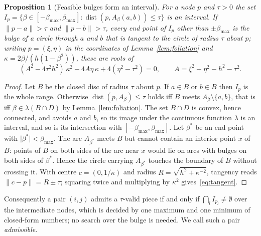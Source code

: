 \documentclass[11pt,a4paper]{article}
\newtheorem{proposition}[theorem]{Proposition}
\theoremstyle{definition}
\theoremstyle{remark}
\newcommand{\dist}{\operatorname{dist}}
\begin{document}
\begin{proposition}[Feasible bulges form an interval]\label{prop:interval}
For a node $p$ and $\tau>0$ the set
$I_p=\{\beta\in[-\beta_{\max},\beta_{\max}]:\dist(p,A_\beta(a,b))\le\tau\}$ is
an interval. If $\lVert p-a\rVert>\tau$ and $\lVert p-b\rVert>\tau$, every end
point of $I_p$ other than $\pm\beta_{\max}$ is the bulge of a circle through
$a$ and $b$ that is tangent to the circle of radius $\tau$ about $p$; writing
$p=(\xi,\eta)$ in the coordinates of Lemma~\ref{lem:foliation} and
$\kappa=2\beta/(h(1-\beta^{2}))$, these are roots of
\begin{equation}\label{eq:tangent}
  (A^{2}-4\tau^{2}h^{2})\,\kappa^{2}-4A\eta\,\kappa+4(\eta^{2}-\tau^{2})=0,
  \qquad A=\xi^{2}+\eta^{2}-h^{2}-\tau^{2}.
\end{equation}
\end{proposition}
\begin{proof}
Let $B$ be the closed disc of radius $\tau$ about $p$. If $a\in B$ or $b\in B$
then $I_p$ is the whole range. Otherwise $\dist(p,A_\beta)\le\tau$ holds iff
$B$ meets $A_\beta\setminus\{a,b\}$, that is iff $\beta\in\lambda(B\cap D)$ by
Lemma~\ref{lem:foliation}. The set $B\cap D$ is convex, hence connected, and
avoids $a$ and $b$, so its image under the continuous function $\lambda$ is an
interval, and so is its intersection with $[-\beta_{\max},\beta_{\max}]$. Let
$\beta^\ast$ be an end point with $\lvert\beta^\ast\rvert<\beta_{\max}$. The
arc $A_{\beta^\ast}$ meets $B$ but cannot contain an interior point $x$ of
$B$: points of $B$ on both sides of the arc near $x$ would lie on arcs with
bulges on both sides of $\beta^\ast$. Hence the circle carrying
$A_{\beta^\ast}$ touches the boundary of $B$ without crossing it. With centre
$c=(0,1/\kappa)$ and radius $R=\sqrt{h^{2}+\kappa^{-2}}$, tangency reads
$\lVert c-p\rVert=R\pm\tau$; squaring twice and multiplying by $\kappa^{2}$
gives~\eqref{eq:tangent}.
\end{proof}

Consequently a pair $(i,j)$ admits a $\tau$-valid piece if and only if
$\bigcap_l I_{p_l}\ne\emptyset$ over the intermediate nodes, which is decided
by one maximum and one minimum of closed-form numbers; no search over the
bulge is needed. We call such a pair \emph{admissible}.
\end{document}
